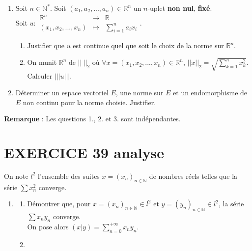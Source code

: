 \documentclass[10pt,oneside]{article}
\begin{document}
\begin{flushleft}
\begin{enumerate}
\item
Soit $n\in\mathbb{N}^*$. Soit $(a_1,a_2,...,a_n)\in\mathbb{R}^n$ un $n$-uplet\textbf{ non nul}, \textbf{fixé}.\\
\medskip
  Soit $u:\begin{array}{ccc}
 \mathbb{R}^n&\longrightarrow & \mathbb{R}\\
 (x_1,x_2,...,x_n)&\longmapsto&  \displaystyle\sum_{i=1}^{n}a_ix_i
 \end{array}$.\\

 \begin{enumerate}
\item 
Justifier que $u$ est continue quel que soit le choix de la norme sur $\mathbb{R}^n$.

   \item
On munit  $\mathbb{R}^n$ de $||\:||_{2}$ où $\forall x=(x_1,x_2,...,x_n)\in \mathbb{R}^n$, $||x||_2=\sqrt{\displaystyle\sum_{k=1}^{n}x_k^2}$.\\
 Calculer $|||u|||$.\\


 
 \end{enumerate}
 \item
Déterminer un espace vectoriel $E$, une norme sur $E$  et un endomorphisme de $E$ non continu pour la norme choisie. Justifier.


\end{enumerate}
\textbf{Remarque} : Les questions 1., 2. et 3. sont indépendantes.


\section*{EXERCICE 39 \:analyse }

 On note $l^2$ l'ensemble des suites $x=(x_n)_{n\in\mathbb{N}}$ de nombres réels telles que la série $\displaystyle\sum x_n^2$ converge.
\begin{enumerate}
\item
\begin{enumerate}
\item 
 Démontrer que, pour $x=(x_n)_{n\in\mathbb{N}} \in l^2$ et $y=(y_n) _{n\in\mathbb{N}}\in l^2$, la série $\displaystyle\sum x_ny_n$ converge.\\
	
On pose alors  $(x|y)=\displaystyle\sum_{n=0}^{+\infty} x_ny_n$.\\

\item 


\end{enumerate}
\end{enumerate}
\end{flushleft}
\end{document}
